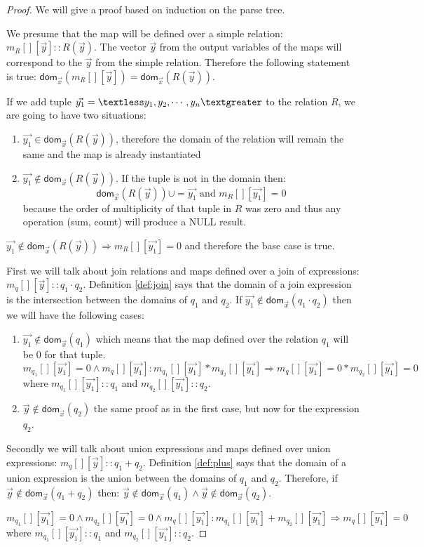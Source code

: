 \documentclass[12pt]{article}
\newcommand{\dom}{\textsf{dom}}
\begin{document}
\begin{proof}
We will give a proof based on induction on the parse tree.

We presume that the map will be defined over a simple relation: $m_R[][\vec{y}]::R(\vec{y})$. The vector $\vec{y}$ from the output variables of the maps will correspond to the $\vec{y}$ from the simple relation. Therefore the following statement is true: $\dom{}_{\vec{x}}(m_R[][\vec{y}])=\dom{}_{\vec{x}}(R(\vec{y}))$.

If we add tuple $\vec{y_1}=\textless y_1,y_2,\cdots,y_n\textgreater$ to the relation $R$, we are going to have two situations:
\begin{enumerate}
\item $\vec{y_1}\in\dom{}_{\vec{x}}(R(\vec{y}))$, therefore the domain of the relation will remain the same and the map is already instantiated
\item $\vec{y_1}\notin\dom{}_{\vec{x}}(R(\vec{y}))$. If the tuple is not in the domain then: $$\dom{}_{\vec x}(R(\vec y))\cup=\vec{y_1}\mbox{ and }m_{R}[][\vec{y_1}]=0$$ because the order of multiplicity of that tuple in $R$ was zero and thus any operation (sum, count) will produce a NULL result.
\end{enumerate}

$\vec{y_1}\notin\dom{}_{\vec{x}}(R(\vec{y}))\Rightarrow m_R[][\vec{y_1}]=0$ and therefore the base case is true.

First we will talk about join relations and maps defined over a join of expressions: $m_q[][\vec{y}]::q_1\cdot q_2$. Definition \ref{def:join} says that the domain of a join expression is the intersection between the domains of $q_1$ and $q_2$. If $\vec{y_1}\notin\dom{}_{\vec{x}}(q_1\cdot q_2)$ then we will have the following cases:
\begin{enumerate}
\item $\vec{y_1}\notin\dom{}_{\vec{x}}(q_1)$ which means that the map defined over the relation $q_1$ will be 0 for that tuple.
$$m_{q_1}[][\vec{y_1}]=0\land m_q[][\vec{y_1}]: m_{q_1}[][\vec{y_1}]*m_{q_2}[][\vec{y_1}]\Rightarrow m_{q}[][\vec{y_1}]=0*m_{q_2}[][\vec{y_1}]=0$$
where $m_{q_1}[][\vec{y_1}]::q_1$ and $m_{q_2}[][\vec{y_1}]::q_2$.
\item $\vec{y}\notin\dom{}_{\vec{x}}(q_2)$ the same proof as in the first case, but now for the expression $q_2$.
\end{enumerate}

Secondly we will talk about union expressions and maps defined over union expressions: $m_q[][\vec{y}]::q_1+q_2$. Definition \ref{def:plus} says that the domain of a union expression is the union between the domains of $q_1$ and $q_2$. Therefore, if $\vec{y}\notin\dom{}_{\vec{x}}(q_1+q_2)$ then: $\vec{y}\notin\dom{}_{\vec{x}}(q_1)\land \vec{y}\notin\dom{}_{\vec{x}}(q_2)$.

$$m_{q_1}[][\vec{y_1}]=0\land m_{q_2}[][\vec{y_1}]=0\land m_q[][\vec{y_1}]: m_{q_1}[][\vec{y_1}]+m_{q_2}[][\vec{y_1}]\Rightarrow m_q[][\vec{y_1}]=0$$
where $m_{q_1}[][\vec{y_1}]::q_1$ and $m_{q_2}[][\vec{y_1}]::q_2$.
\end{proof}
\end{document}
